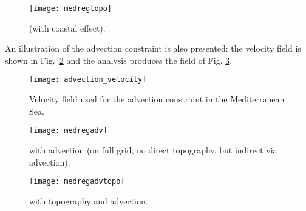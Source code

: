 \begin{figure}[H]
\centering
\parbox{.6\textwidth}{
\texttt{[image: medregtopo]}
}\parbox{.4\textwidth}{
\caption{\diva (with coastal effect).\label{fig:medregtopo} }
}
\end{figure}

An illustration of the advection constraint is also presented: the velocity field is shown in Fig.~\ref{fig:medsea_vel} and the analysis produces the field of Fig. \ref{fig:medsea_adv}.

\begin{figure}[H]
\centering
\parbox{.6\textwidth}{
\texttt{[image: advection\_velocity]}
}\parbox{.4\textwidth}{
\caption{Velocity field used for the advection constraint in the Mediterranean Sea.\label{fig:medsea_vel}}
}
\end{figure}

\begin{figure}[H]
\centering
\parbox{.6\textwidth}{
\texttt{[image: medregadv]}
}\parbox{.4\textwidth}{
\caption{\diva with advection (on full grid, no direct topography, but indirect 
via advection).\label{fig:medsea_adv}}
}
\end{figure}


\begin{figure}[H]
\centering
\parbox{.6\textwidth}{
\texttt{[image: medregadvtopo]}
}\parbox{.4\textwidth}{
\caption{\diva with topography and advection.}
}
\end{figure}


